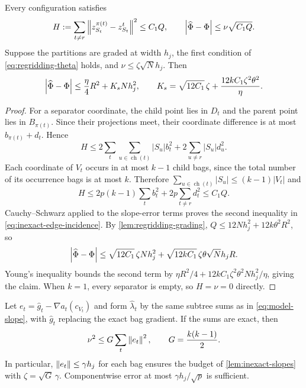 \begin{lemma}
 \label{lem:inexact-slopes}
Every configuration satisfies
\begin{equation}
 H:=\sum_{t\ne r}\left\lVert z^{\pi(t)}_{S_t}-z^t_{S_t}\right\rVert^2
       \le C_1Q,\qquad
 \left\lvert \widehat\Phi-\Phi\right\rvert\le\nu\sqrt{C_1Q}.
 \label{eq:inexact-edge-incidence}
\end{equation}
Suppose the partitions are graded at width $h_j$, the first condition
of \eqref{eq:regridding-theta} holds, and
$\nu\le\zeta\sqrt N h_j$.  Then
\begin{equation}
 \left\lvert \widehat\Phi-\Phi\right\rvert
       \le\frac\eta4R^2+K_sNh_j^2,
 \qquad
 K_s=\sqrt{12C_1}\,\zeta
              +\frac{12kC_1\zeta^2\theta^2}{\eta}.
 \label{eq:inexact-slope-perturbation}
\end{equation}
\end{lemma}

\begin{proof}
For a separator coordinate, the child point lies in $D_t$ and the parent
point lies in $B_{\pi(t)}$.  Since their projections
meet, their coordinate difference is at most
$b_{\pi(t)}+d_t$.  Hence
\[
 H\le2\sum_t\sum_{u\in\operatorname{ch}(t)}|S_u|b_t^2
            +2\sum_{u\ne r}|S_u|d_u^2.
\]
Each coordinate of $V_t$ occurs in at most $k-1$ child bags, since the
total number of its occurrence bags is at most $k$.  Therefore
$\sum_{u\in\operatorname{ch}(t)}|S_u|\le(k-1)|V_t|$ and
\[
 H\le2p(k-1)\sum_t b_t^2+2p\sum_{t\ne r}d_t^2\le C_1Q.
\]
Cauchy--Schwarz applied to the slope-error terms proves the second
inequality in \eqref{eq:inexact-edge-incidence}.  By
\cref{lem:regridding-grading},
$Q\le12Nh_j^2+12k\theta^2R^2$, so
\[
 \left\lvert \widehat\Phi-\Phi\right\rvert
 \le\sqrt{12C_1}\,\zeta Nh_j^2
       +\sqrt{12kC_1}\,\zeta\theta\sqrt N h_jR.
\]
Young's inequality bounds the second term by
$\eta R^2/4+12kC_1\zeta^2\theta^2Nh_j^2/\eta$, giving the claim.
When $k=1$, every separator is empty, so $H=\nu=0$ directly.
\end{proof}

\begin{lemma}
 \label{lem:inexact-gradients}
Let $e_t=\widehat g_t-\nabla a_t(c_{V_t})$ and form
$\widehat\lambda_t$ by the same subtree sums as in
\eqref{eq:model-slope}, with $\widehat g_t$ replacing the exact bag
gradient.  If the sums are exact, then
\begin{equation}
 \nu^2\le G\sum_t\left\lVert e_t\right\rVert^2,
 \qquad G=\frac{k(k-1)}2.
 \label{eq:inexact-gradient-incidence}
\end{equation}
In particular, $\left\lVert e_t\right\rVert\le\gamma h_j$ for each bag ensures the
budget of \cref{lem:inexact-slopes} with $\zeta=\sqrt G\,\gamma$.
Componentwise error at most $\gamma h_j/\sqrt p$ is sufficient.
\end{lemma}

